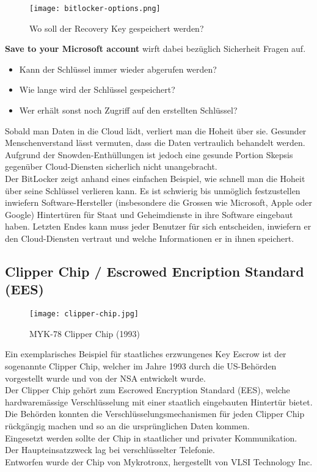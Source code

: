 \begin{figure}[H]
	\centering
	\texttt{[image: bitlocker-options.png]}
	\caption{Wo soll der Recovery Key gespeichert werden?}
	{\cite{bitlocker}}
	\label{fig:clipper-chip}
\end{figure}
\textbf{Save to your Microsoft account} wirft dabei bezüglich Sicherheit Fragen auf.
\begin{itemize}
	\item Kann der Schlüssel immer wieder abgerufen werden?
	\item Wie lange wird der Schlüssel gespeichert?
	\item Wer erhält sonst noch Zugriff auf den erstellten Schlüssel?
\end{itemize}
Sobald man Daten in die Cloud lädt, verliert man die Hoheit über sie. Gesunder Menschenverstand lässt vermuten, dass die Daten vertraulich behandelt werden. Aufgrund der Snowden-Enthüllungen ist jedoch eine gesunde Portion Skepsis gegenüber Cloud-Diensten sicherlich nicht unangebracht.\\
Der BitLocker zeigt anhand eines einfachen Beispiel, wie schnell man die Hoheit über seine Schlüssel verlieren kann. Es ist schwierig bis unmöglich festzustellen inwiefern Software-Hersteller (insbesondere die Grossen wie Microsoft, Apple oder Google) Hintertüren für Staat und Geheimdienste in ihre Software eingebaut haben. Letzten Endes kann muss jeder Benutzer für sich entscheiden, inwiefern er den Cloud-Diensten vertraut und welche Informationen er in ihnen speichert.

	\subsection{Clipper Chip / Escrowed Encription Standard (EES)} \label{ssec:clipperchip}
\begin{figure}[H]
	\centering
	\texttt{[image: clipper-chip.jpg]}
	\caption{MYK-78 Clipper Chip (1993)}
	\label{fig:clipper-chip}
\end{figure}
Ein exemplarisches Beispiel für staatliches erzwungenes Key Escrow ist der sogenannte Clipper Chip, welcher im Jahre 1993 durch die US-Behörden vorgestellt wurde und von der NSA entwickelt wurde.\\
Der Clipper Chip gehört zum Escrowed Encryption Standard (EES), welche hardwaremässige Verschlüsselung mit einer staatlich eingebauten Hintertür bietet. Die Behörden konnten die Verschlüsselungsmechanismen für jeden Clipper Chip rückgängig machen und so an die ursprünglichen Daten kommen. \\
Eingesetzt werden sollte der Chip in staatlicher und privater Kommunikation. Der Haupteinsatzzweck lag bei verschlüsselter Telefonie. \cite{ees}\\
Entworfen wurde der Chip von Mykrotronx, hergestellt von VLSI Technology Inc. \\

